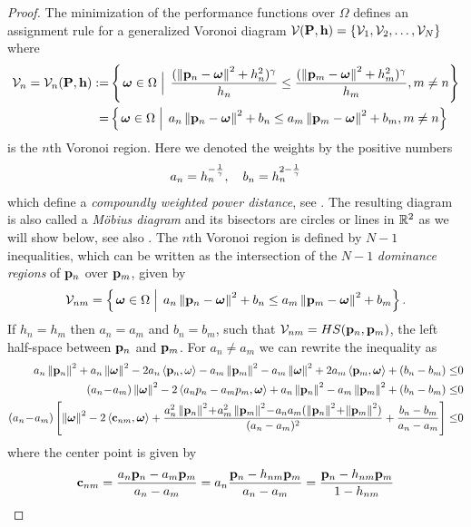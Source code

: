 \documentclass[smallabstract,smallcaptions]{dccpaper}
\newcommand{\gP}{\ensuremath{\vP}}          %
\newcommand{\bH}{\ensuremath{\vh}}          %
\newcommand{\Vor}{\ensuremath{\mathcal{V}}}         %
\begin{document}
\begin{proof}
  The minimization of the performance functions over $\Omega$ defines an assignment rule for a generalized Voronoi diagram
  $\Vor(\gP,\bH)=\{\Vor_1,\Vor_2,\dots,\Vor_N\}$ where 
  \begin{align}
    \Vor_{n} =\Vor_n(\gP,\bH):=
  &\set{\vome\in\Ome}{\frac{(\Norm{\vp_n-\vome}^2 +h_n^2)^{\gam}}{h_n}\leq\frac{(\Norm{\vp_m-\vome}^2 +h_m^2)^{\gam}}{h_m}, m\not=n}\\
    =&\set{\vome\in\Ome}{ a_n\Norm{\vp_n-\vome}^2 +b_n \leq  a_m\Norm{\vp_m-\vome}^2 +b_m, m\not=n}
  \end{align}
  is the $n$th Voronoi region. Here we denoted the weights by the positive numbers
  \begin{align}
    a_n = h_n^{-\frac{1}{\gamma}}, \quad b_n=h_n^{2-\frac{1}{\gamma}}
  \end{align}
  which define a \emph{compoundly weighted power distance}, see \cite[(3.1.12)]{OBSC00}. The resulting diagram is also called
  a \emph{M{\"o}bius diagram} and its bisectors are circles or lines in ${\mathbb R}^2$ as we will show below, see also \cite{BK06b,BWY07}.
  The $n$th Voronoi region is defined by $N-1$ inequalities, which  can be written as the intersection of the $N-1$
  \emph{dominance regions} of ${\mathbf p}_n$ over ${\mathbf p}_m$, given by 
  \begin{align}
    \Vor_{nm}=\set{\vome\in\Ome}{ a_n\Norm{\vp_n-\vome}^2 +b_n \leq  a_m\Norm{\vp_m-\vome}^2 +b_m}.
  \end{align}
  If $h_n=h_m$ then $a_n=a_m$ and $b_n=b_m$, such that $\Vor_{nm}=HS(\vp_n,\vp_m)$, the left half-space between ${\mathbf p}_n$
  and ${\mathbf p}_m$. For $a_n\not=a_m$ we can rewrite the inequality as 
  \begin{align*}
    a_n \Norm{\vp_n}^2 + a_n \Norm{\vome}^2 -2a_n\skprod{\vp_n}{\ome} - a_m\Norm{\vp_m}^2 - a_m\Norm{\vome}^2
    +2a_m\skprod{\vp_m}{\vome} + (b_n-b_m) \leq &0\\
     (a_n\!-\!a_m)\Norm{\vome}^2 -2 \skprod{a_np_n- a_mp_m}{\vome} + a_n \Norm{\vp_n}^2 - a_m \Norm{\vp_m}^2 +(b_n-b_m) \leq & 0 \\
     (a_n\!-\!a_m)\left[ \Norm{\vome}^2 -2 \skprod{\vc_{nm}}{\vome} 
    + \frac{a_n^2 \Norm{\vp_n}^2 \!+\!a_m^2 \Norm{\vp_m}^2 \!-\! a_na_m(\Norm{\vp_n}^2 \!+\!\Norm{\vp_m}^2)}{(a_n-a_m)^2} + \frac{b_n-b_m}{a_n-a_m}
   \right]\leq & 0
  \end{align*}
  where the center point is given by
  \begin{align}
    \vc_{nm}=\frac{a_n\vp_n- a_m\vp_m}{a_n-a_m}=a_n \frac{\vp_n-h_{nm} \vp_m}{a_n -a_m}=\frac{\vp_n -h_{nm}\vp_m}{1-h_{nm}} 

\end{align}
\end{proof}
\end{document}
